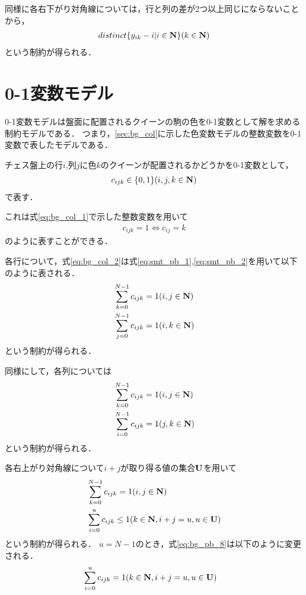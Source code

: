同様に各右下がり対角線については，行と列の差が2つ以上同じにならないことから，
\begin{eqnarray}
    distinct\{y_{ik}-i | i \in {\bf N} \} (k \in {\bf N}) \label{eq:bg_pos_5}
\end{eqnarray}
という制約が得られる．


\section{0-1変数モデル}\label{sec:bg_pb}
0-1変数モデルは盤面に配置されるクイーンの駒の色を0-1変数として解を求める制約モデルである．
つまり，\ref{sec:bg_col}に示した色変数モデルの整数変数を0-1変数で表したモデルである．

チェス盤上の行$i$,列$j$に色$k$のクイーンが配置されるかどうかを0-1変数として，
\begin{eqnarray}
    c_{ijk} \in \{0,1\} (i,j,k \in {\bf N}) \label{eq:bg_pb_1}
\end{eqnarray}
で表す．

これは式\ref{eq:bg_col_1}で示した整数変数を用いて
\begin{eqnarray}
    c_{ijk}=1 \Leftrightarrow c_{ij}=k \label{eq:bg_pb_2}
 \end{eqnarray}
のように表すことができる．

各行について，式\ref{eq:bg_col_2}は式\ref{eq:smt_pb_1},\ref{eq:smt_pb_2}を用いて以下のように表される．
\begin{eqnarray}
    & \sum_{k=0}^{N-1} c_{ijk} = 1     (i,j \in {\bf N}) \label{eq:bg_pb_3}\\
    & \sum_{j=0}^{N-1} c_{ijk} = 1     (i,k \in {\bf N}) \label{eq:bg_pb_4}
\end{eqnarray}
という制約が得られる．

同様にして，各列については
\begin{eqnarray}
    & \sum_{k=0}^{N-1} c_{ijk} = 1     (i,j \in {\bf N}) \label{eq:bg_pb_5}\\
    & \sum_{i=0}^{N-1} c_{ijk} = 1     (j,k \in {\bf N}) \label{eq:bg_pb_6}
\end{eqnarray}
という制約が得られる．

各右上がり対角線について$i+j$が取り得る値の集合$\bf U$を用いて
\begin{eqnarray}
    & \sum_{k=0}^{N-1} c_{ijk} = 1     (i,j \in {\bf N})    \label{eq:bg_pb_7}\\
    & \sum_{i=0}^{u} c_{ijk} \leq 1  (k \in {\bf N}, i+j=u, u \in {\bf U}) \label{eq:bg_pb_8}
\end{eqnarray}
という制約が得られる．
$u=N-1$のとき，式\ref{eq:bg_pb_8}は以下のように変更される．
\begin{eqnarray}
    & \sum_{i=0}^{u} c_{ijk} = 1  (k \in {\bf N}, i+j=u, u \in {\bf U}) \label{eq:bg_pb_9}
\end{eqnarray}


